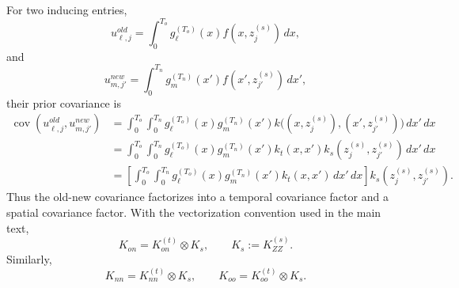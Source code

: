 \documentclass[12pt]{article}
\newcommand{\cov}{\operatorname{cov}}
\begin{document}
For two inducing entries,
\begin{equation}
    u_{\ell,j}^{old}
    =
    \int_0^{T_o}
    g_\ell^{(T_o)}(x)f(x,z_j^{(s)})\,dx,
\end{equation}
and
\begin{equation}
    u_{m,j'}^{new}
    =
    \int_0^{T_n}
    g_m^{(T_n)}(x')f(x',z_{j'}^{(s)})\,dx',
\end{equation}
their prior covariance is
\begin{align}
    \cov
    \left(
        u_{\ell,j}^{old},
        u_{m,j'}^{new}
    \right)
    &=
    \int_0^{T_o}
    \int_0^{T_n}
    g_\ell^{(T_o)}(x)
    g_m^{(T_n)}(x')
    k\big((x,z_j^{(s)}),(x',z_{j'}^{(s)})\big)
    \,dx'\,dx                                                  \\
    &=
    \int_0^{T_o}
    \int_0^{T_n}
    g_\ell^{(T_o)}(x)
    g_m^{(T_n)}(x')
    k_t(x,x')
    k_s(z_j^{(s)},z_{j'}^{(s)})
    \,dx'\,dx                                                   \\
    &=
    \left[
    \int_0^{T_o}
    \int_0^{T_n}
    g_\ell^{(T_o)}(x)
    g_m^{(T_n)}(x')
    k_t(x,x')
    \,dx'\,dx
    \right]
    k_s(z_j^{(s)},z_{j'}^{(s)}).
    \label{eq:app_old_new_cov_entry}
\end{align}
Thus the old-new covariance factorizes into a temporal covariance factor
and a spatial covariance factor. With the vectorization convention used in
the main text,
\begin{equation}
    K_{on}
    =
    K_{on}^{(t)}\otimes K_s,
    \qquad
    K_s:=K_{ZZ}^{(s)}.
    \label{eq:app_Kon_kron}
\end{equation}
Similarly,
\begin{equation}
    K_{nn}
    =
    K_{nn}^{(t)}\otimes K_s,
    \qquad
    K_{oo}
    =
    K_{oo}^{(t)}\otimes K_s.
    \label{eq:app_Knn_Koo_kron}
\end{equation}
\end{document}
